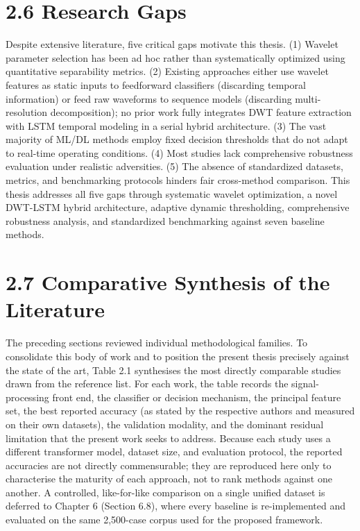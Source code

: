 \section{2.6  Research Gaps}
Despite extensive literature, five critical gaps motivate this thesis. (1) Wavelet parameter selection has been ad hoc rather than systematically optimized using quantitative separability metrics. (2) Existing approaches either use wavelet features as static inputs to feedforward classifiers (discarding temporal information) or feed raw waveforms to sequence models (discarding multi-resolution decomposition); no prior work fully integrates DWT feature extraction with LSTM temporal modeling in a serial hybrid architecture. (3) The vast majority of ML/DL methods employ fixed decision thresholds that do not adapt to real-time operating conditions. (4) Most studies lack comprehensive robustness evaluation under realistic adversities. (5) The absence of standardized datasets, metrics, and benchmarking protocols hinders fair cross-method comparison. This thesis addresses all five gaps through systematic wavelet optimization, a novel DWT-LSTM hybrid architecture, adaptive dynamic thresholding, comprehensive robustness analysis, and standardized benchmarking against seven baseline methods.


\section{2.7  Comparative Synthesis of the Literature}
The preceding sections reviewed individual methodological families. To consolidate this body of work and to position the present thesis precisely against the state of the art, Table 2.1 synthesises the most directly comparable studies drawn from the reference list. For each work, the table records the signal-processing front end, the classifier or decision mechanism, the principal feature set, the best reported accuracy (as stated by the respective authors and measured on their own datasets), the validation modality, and the dominant residual limitation that the present work seeks to address. Because each study uses a different transformer model, dataset size, and evaluation protocol, the reported accuracies are not directly commensurable; they are reproduced here only to characterise the maturity of each approach, not to rank methods against one another. A controlled, like-for-like comparison on a single unified dataset is deferred to Chapter 6 (Section 6.8), where every baseline is re-implemented and evaluated on the same 2,500-case corpus used for the proposed framework.

